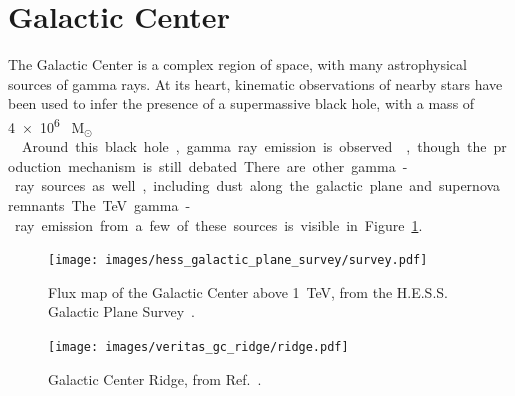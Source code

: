 \FloatBarrier

\section{Galactic Center}\label{sec:gc}
  
  The Galactic Center is a complex region of space, with many astrophysical sources of gamma rays.
  At its heart, kinematic observations of nearby stars have been used to infer the presence of a supermassive black hole, with a mass of \SI{4e6}{ M${{}_\odot}$ }~\cite{sgra_massdist}.
  Around this black hole, gamma ray emission is observed~\cite{gc_pointsrc_hess,gc_pointsource_hess2,gc_veritas_pointsource,gc_magic_pointsource}, though the production mechanism is still debated.
  There are other gamma-ray sources as well, including dust along the galactic plane and supernova remnants.
  The TeV gamma-ray emission from a few of these sources is visible in Figure~\ref{fig:hess_plane}.
  
  \begin{figure}[!t]
    \centering
    \texttt{[image: images/hess\_galactic\_plane\_survey/survey.pdf]}
    \caption[HESS GC Survey]{
      Flux map of the Galactic Center above \SI{1}{\TeV}, from the H.E.S.S. Galactic Plane Survey~\cite{hess_gc_plane2}.
      \CaptionBlankLine
    }
    \label{fig:hess_plane}
  \end{figure}
  
  \begin{figure}[!b]
    \centering
    \texttt{[image: images/veritas\_gc\_ridge/ridge.pdf]}
    \caption[VERITAS View of the Galactic Center Ridge]{
      Galactic Center Ridge, from Ref.~\cite{VeritasGCRidge2015}.
      \CaptionBlankLine
    }
    \label{fig:veritas_gc_ridge}
  \end{figure}

